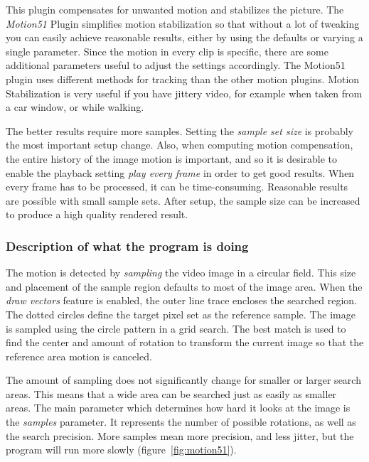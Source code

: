 This plugin compensates for unwanted motion and stabilizes the picture. The \textit{Motion51} Plugin simplifies motion stabilization so that without a lot of tweaking you can easily achieve reasonable results, either by using the defaults or varying a single parameter. Since the motion in every clip is specific, there are some additional parameters useful to adjust the settings accordingly. 
The Motion51 plugin uses different methods for tracking than the other motion plugins. Motion Stabilization is very useful if you have jittery video, for example when taken from a car window, or while walking.

The better results require more samples. Setting the \textit{sample set size} is probably the most important setup change. Also, when computing motion compensation, the entire history of the image motion is important, and so it is desirable to enable the playback setting \textit{play every frame} in order to get good results. When every frame has to be processed, it can be time-consuming. Reasonable results are possible with small sample sets. After setup, the sample size can be increased to produce a high quality rendered result.

\subsubsection*{Description of what the program is doing}
\label{ssub:description_program_doing}

The motion is detected by \textit{sampling} the video image in a circular field. This size and placement of the sample region defaults to most of the image area. When the \textit{draw vectors} feature is enabled, the outer line trace encloses the searched region. The dotted circles define the target pixel set as the reference sample. The image is sampled using the circle pattern in a grid search. The best match is used to find the center and amount of rotation to transform the current image so that the reference area motion is canceled.

The amount of sampling does not significantly change for smaller or larger search areas. This means that a wide area can be searched just as easily as smaller areas. The main parameter which determines how hard it looks at the image is the \textit{samples} parameter. It represents the number of possible rotations, as well as the search precision. More samples mean more precision, and less jitter, but the program will run more slowly (figure~\ref{fig:motion51}).

